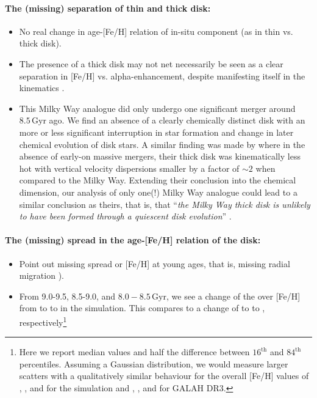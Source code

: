 \documentclass[fleqn,usenatbib]{mnras}
\begin{document}
\paragraph*{The (missing) separation of thin and thick disk:}
\begin{itemize}
    \item No real change in age-[Fe/H] relation of in-situ component (as in thin vs. thick disk).
    \item The presence of a thick disk may not net necessarily be seen as a clear separation in [Fe/H] vs. alpha-enhancement, despite manifesting itself in the kinematics \citep[see e.g.][their Fig.~12]{MCM2013}.
    \item This Milky Way analogue did only undergo one significant merger around $8.5\,\mathrm{Gyr}$ ago. We find an absence of a clearly chemically distinct disk with an more or less significant interruption in star formation and change in later chemical evolution of disk stars. A similar finding was made by \citet{MCM2013} where in the absence of early-on massive mergers, their thick disk was kinematically less hot with vertical velocity dispersions smaller by a factor of $\sim 2$ when compared to the Milky Way. Extending their conclusion into the chemical dimension, our analysis of only one(!) Milky Way analogue could lead to a similar conclusion as theirs, that is, that ``\textit{the Milky Way thick disk is unlikely to have been formed through a quiescent disk evolution}'' \citep{MCM2013}.
\end{itemize}

\paragraph*{The (missing) spread in the age-[Fe/H] relation of the disk:}

\begin{itemize}
    \item Point out missing spread or [Fe/H] at young ages, that is, missing radial migration \citep{Minchev2010, Loebman2011, Frankel2018}).
    \item From 9.0-9.5, 8.5-9.0, and $8.0-8.5\,\mathrm{Gyr}$, we see a change of the over [Fe/H] from  to  to  in the simulation. This compares to a change of  to  to , respectively\footnote{Here we report median values and half the difference between $16^\mathrm{th}$ and $84^\mathrm{th}$ percentiles. Assuming a Gaussian distribution, we would measure larger scatters with a qualitatively similar behaviour for the overall [Fe/H] values of ,  , and   for the simulation and ,  , and  for GALAH DR3.}
\end{itemize}
\end{document}
